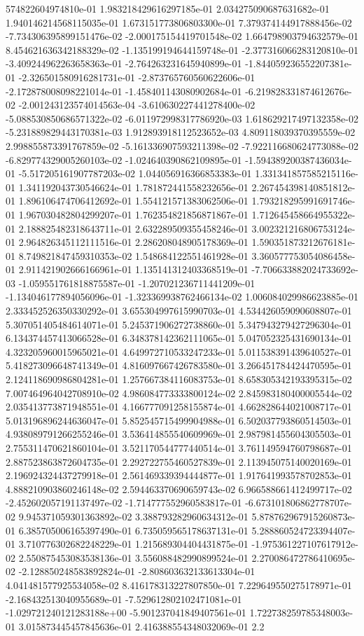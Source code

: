 574822604974810e-01	1.983218429616297185e-01	2.034275090687631682e-01	1.940146214568115035e-01	1.673151773806803300e-01	7.379374144917888456e-02	-7.734306395899151476e-02	-2.000175154419701548e-02	1.664798903794632579e-01	8.454621636342188329e-02	-1.135199194644159748e-01	-2.377316066283120810e-01	-3.409244962263658363e-01	-2.764263231645940899e-01	-1.844059236552207381e-01	-2.326501580916281731e-01	-2.873765760560622606e-01	-2.172878008098221014e-01	-1.458401143080902684e-01	-6.219828331874612676e-02	-2.001243123574014563e-04	-3.610630227441278400e-02	-5.088530850686571322e-02	-6.011972998317786920e-03	1.618629217497132358e-02	-5.231889829443170381e-03	1.912893918112523652e-03	4.809118039370395559e-02	2.998855873391767859e-02	-5.161336907593211398e-02	-7.922116680624773088e-02	-6.829774329005260103e-02	-1.024640390862109895e-01	-1.594389200387436034e-01	-5.517205161907787203e-02	1.044056916366853383e-01	1.331341857585215116e-01	1.341192043730546624e-01	1.781872441558232656e-01	2.267454398140851812e-01	1.896106474706412692e-01	1.554121571383062506e-01	1.793218295991691746e-01	1.967030482804299207e-01	1.762354821856871867e-01	1.712645458664955322e-01	2.188825482318643711e-01	2.632289509355458246e-01	3.002321216806753124e-01	2.964826345112111516e-01	2.286208048905178369e-01	1.590351873212676181e-01	8.749821847459310353e-02	1.548684122551461928e-01	3.360577753054086458e-01	2.911421902666166961e-01	1.135141312403368519e-01	-7.706633882024733692e-03	-1.059551761818875587e-01	-1.207021236711441209e-01	-1.134046177894056096e-01	-1.323369938762466134e-02	1.006084029986623885e-01	2.333452526350330292e-01	3.655304997615990703e-01	4.534426059090608807e-01	5.307051405484614071e-01	5.245371906272738860e-01	5.347943279427296304e-01	6.134374457413066528e-01	6.348378142362111065e-01	5.047052325431690134e-01	4.323205960015965021e-01	4.649972710533247233e-01	5.011538391439640527e-01	5.418273096648741349e-01	4.816097667426783580e-01	3.266451784424470595e-01	2.124118690986804281e-01	1.257667384116083753e-01	8.658305342193395315e-02	7.007464964042708910e-02	4.986084773333800124e-02	2.845983180400005544e-02	2.035413773871948551e-01	4.166777091258155874e-01	4.662828644021008717e-01	5.013196896244636047e-01	5.852545715499904988e-01	6.502037793860514503e-01	4.938089791266255246e-01	3.536414855540609969e-01	2.987981455604305503e-01	2.755311470621860104e-01	3.521170544777440514e-01	3.761149594760798687e-01	2.887523863872604735e-01	2.292722755460527839e-01	2.113945075140020169e-01	2.196924324437279918e-01	2.561469339394444877e-01	1.917641993578702853e-01	4.888210903860246148e-02	2.594463370690659743e-02	6.966588661412499717e-02	-2.452602057191137497e-02	-1.714777552960583817e-01	-6.673101806862778707e-02	9.945371059301363892e-02	3.388793282960634312e-01	5.878762967915260873e-01	6.385705006165397490e-01	6.735059565178637131e-01	5.288860524723394407e-01	3.710776302682248229e-01	1.215689304404431875e-01	-1.975361227107617912e-02	2.550875453083538136e-01	3.556088482990899524e-01	2.270086472786410695e-02	-2.128850248583892824e-01	-2.808603632133613304e-01	4.041481577925534058e-02	8.416178313227807850e-01	7.229649550275178971e-01	-2.168432513040955689e-01	-7.529612802102471081e-01	-1.029721240121283188e+00	-5.901237041849407561e-01	1.722738259785348003e-01	3.015873445457845636e-01	2.416388554348032069e-01	2.2